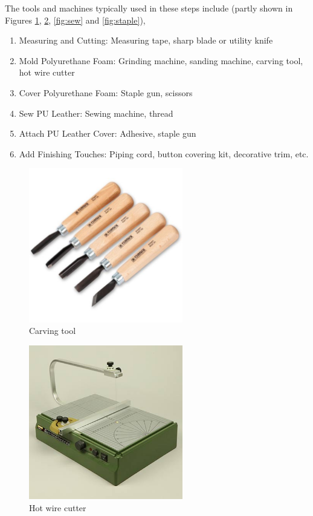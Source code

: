 The tools and machines typically used in these steps include (partly shown in Figures \ref{fig:carving}, \ref{fig:wire_cutter}, \ref{fig:sew} and \ref{fig:staple}),
\begin{enumerate}
    \item Measuring and Cutting: Measuring tape, sharp blade or utility knife
    \item Mold Polyurethane Foam: Grinding machine, sanding machine, carving tool, hot wire cutter
    \item Cover Polyurethane Foam: Staple gun, scissors
    \item Sew PU Leather: Sewing machine, thread
    \item Attach PU Leather Cover: Adhesive, staple gun
    \item Add Finishing Touches: Piping cord, button covering kit, decorative trim, etc.
\end{enumerate}

\begin{figure}[!htp]
    \centering
    \includegraphics[width=0.6\textwidth]{images/carving tool.jpg}
    \caption{Carving tool}
    \label{fig:carving}
\end{figure}

\begin{figure}[!htp]
    \centering
    \includegraphics[width=0.6\textwidth]{images/hot wire cutter.jpg}
    \caption{Hot wire cutter}
    \label{fig:wire_cutter}
\end{figure}


